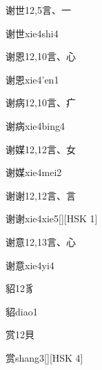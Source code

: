\begin{entry}{谢世}{12,5}{⾔、⼀}
  \begin{phonetics}{谢世}{xie4shi4}
  \end{phonetics}
\end{entry}

\begin{entry}{谢恩}{12,10}{⾔、⼼}
  \begin{phonetics}{谢恩}{xie4'en1}
  \end{phonetics}
\end{entry}

\begin{entry}{谢病}{12,10}{⾔、⽧}
  \begin{phonetics}{谢病}{xie4bing4}
  \end{phonetics}
\end{entry}

\begin{entry}{谢媒}{12,12}{⾔、⼥}
  \begin{phonetics}{谢媒}{xie4mei2}
  \end{phonetics}
\end{entry}

\begin{entry}{谢谢}{12,12}{⾔、⾔}
  \begin{phonetics}{谢谢}{xie4xie5}[][HSK 1]
  \end{phonetics}
\end{entry}

\begin{entry}{谢意}{12,13}{⾔、⼼}
  \begin{phonetics}{谢意}{xie4yi4}
  \end{phonetics}
\end{entry}

\begin{entry}{貂}{12}{⾘}
  \begin{phonetics}{貂}{diao1}
  \end{phonetics}
\end{entry}

\begin{entry}{赏}{12}{⾙}
  \begin{phonetics}{赏}{shang3}[][HSK 4]
  \end{phonetics}
\end{entry}

